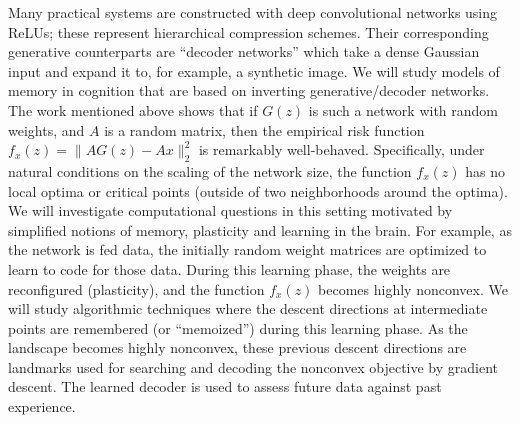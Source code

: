 Many practical systems are constructed with deep convolutional
networks using ReLUs; these represent hierarchical compression
schemes. Their corresponding generative counterparts are ``decoder
networks'' which take a dense Gaussian input and expand it to, for
example, a synthetic image.  We will study models of memory in
cognition that are based on inverting generative/decoder networks. The
work \cite{HandV17} mentioned above shows that if $G(z)$ is such a
network with random weights, and $A$ is a random matrix, then the
empirical risk function $ f_x(z) = \|AG(z) - Ax\|_2^2$ is remarkably
well-behaved. Specifically, under natural conditions on the scaling of
the network size, the function $f_x(z)$ has no local optima or
critical points (outside of two neighborhoods around the optima). We
will investigate computational questions in this setting motivated by
simplified notions of memory, plasticity and learning in the
brain. For example, as the network is fed data, the initially random
weight matrices are optimized to learn to code for those data.  During
this learning phase, the weights are reconfigured (plasticity), and
the function $f_x(z)$ becomes highly nonconvex. We will study
algorithmic techniques where the descent directions at intermediate
points are remembered (or ``memoized'') during this learning phase. As
the landscape becomes highly nonconvex, these previous descent
directions are landmarks used for searching and decoding the nonconvex
objective by gradient descent. The learned decoder is used to assess
future data against past experience.

